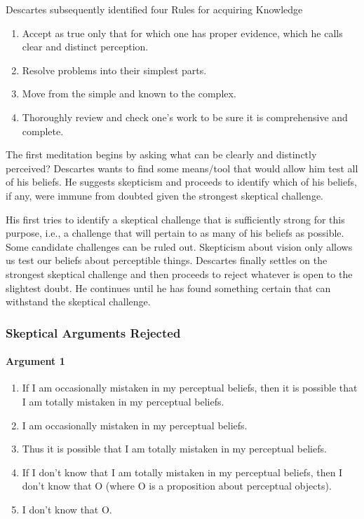 \documentclass[]{article}
\begin{document}
Descartes subsequently identified four Rules for acquiring Knowledge

\begin{enumerate}
\def\labelenumi{\arabic{enumi}.}
\item
  Accept as true only that for which one has proper evidence, which he
  calls clear and distinct perception.
\item
  Resolve problems into their simplest parts.
\item
  Move from the simple and known to the complex.
\item
  Thoroughly review and check one's work to be sure it is comprehensive
  and complete.
\end{enumerate}

The first meditation begins by asking what can be clearly and distinctly
perceived? Descartes wants to find some means/tool that would allow him
test all of his beliefs. He suggests skepticism and proceeds to identify
which of his beliefs, if any, were immune from doubted given the
strongest skeptical challenge.

His first tries to identify a skeptical challenge that is sufficiently
strong for this purpose, i.e., a challenge that will pertain to as many
of his beliefs as possible. Some candidate challenges can be ruled out.
Skepticism about vision only allows us test our beliefs about
perceptible things. Descartes finally settles on the strongest skeptical
challenge and then proceeds to reject whatever is open to the slightest
doubt. He continues until he has found something certain that can
withstand the skeptical challenge.

\subsubsection{Skeptical Arguments
Rejected}\label{skeptical-arguments-rejected}

\paragraph{Argument 1}\label{argument-1}

\begin{enumerate}
\def\labelenumi{\arabic{enumi}.}
\itemsep1pt\parskip0pt
\item
  If I am occasionally mistaken in my perceptual beliefs, then it is
  possible that I am totally mistaken in my perceptual beliefs.
\item
  I am occasionally mistaken in my perceptual beliefs.
\item
  Thus it is possible that I am totally mistaken in my perceptual
  beliefs.
\item
  If I don't know that I am totally mistaken in my perceptual beliefs,
  then I don't know that O (where O is a proposition about perceptual
  objects).
\item
  I don't know that O.
\end{enumerate}
\end{document}
